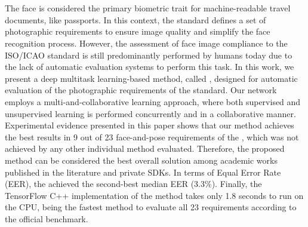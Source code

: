 \section*{}

The face is considered the primary biometric trait for machine-readable travel documents, like passports. In this context, the \icao standard defines a set of photographic requirements to ensure image quality and simplify the face recognition process. However, the assessment of face image compliance to the ISO/ICAO standard is still predominantly performed by humans today due to the lack of automatic evaluation systems to perform this task. In this work, we present a deep multitask learning-based method, called \methodname, designed for automatic evaluation of the photographic requirements of the \icao standard. Our network employs a multi-and-collaborative learning approach, where both supervised and unsupervised learning is performed concurrently and in a collaborative manner. Experimental evidence presented in this paper shows that our method achieves the best results in 9 out of 23 face-and-pose requirements of the \icao, which was not achieved by any other individual method evaluated. Therefore, the proposed method can be considered the best overall solution among academic works published in the literature and private SDKs. In terms of Equal Error Rate (EER), the \methodname achieved the second-best median EER (3.3\%). Finally, the TensorFlow C++ implementation of the method takes only 1.8 seconds to run on the CPU, being the fastest method to evaluate all 23 requirements according to the official benchmark.

\newpage